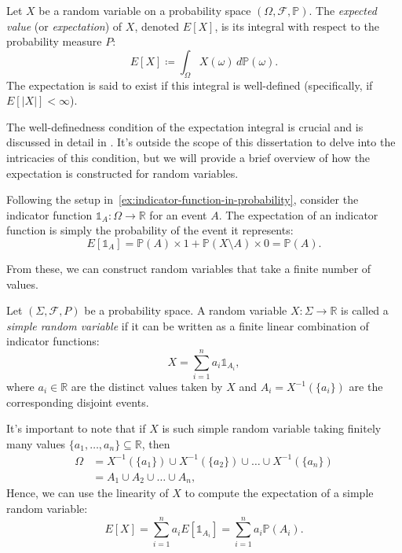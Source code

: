 \begin{definition}
    Let $X$ be a random variable on a probability space $(\Omega, \mathcal{F}, \mathbb{P})$. The \emph{expected value} (or \emph{expectation}) of $X$, denoted $E[X]$, is its integral with respect to the probability measure $P$:
    \[
        E[X] \coloneq \int_{\Omega} X(\omega) \, d\mathbb{P}(\omega).
    \]
    The expectation is said to exist if this integral is well-defined (specifically, if $E[|X|] < \infty$).
\end{definition}

The well-definedness condition of the expectation integral is crucial and is discussed in detail in \cite[Chap 8]{MeasureTheoryLeGall}. It's outside the scope of this dissertation to delve into the intricacies of this condition, but we will provide a brief overview of how the expectation is constructed for random variables.

\begin{example}
    Following the setup in~\ref{ex:indicator-function-in-probability}, consider the indicator function $\mathds{1}_A: \Omega \to \mathbb{R}$ for an event $A$. The expectation of an indicator function is simply the probability of the event it represents:
    \[
        E[\mathds{1}_A] = \mathbb{P}(A) \times 1 + \mathbb{P}(X \setminus A) \times 0 = \mathbb{P}(A).
    \]
\end{example}

From these, we can construct random variables that take a finite number of values.

\begin{definition}
    Let $(\Sigma, \mathcal{F}, P)$ be a probability space. A random variable $X: \Sigma \to \mathbb{R}$ is called a \emph{simple random variable} if it can be written as a finite linear combination of indicator functions:
    \[
        X = \sum_{i=1}^n a_i \mathds{1}_{A_i},
    \]
    where $a_i \in \mathbb{R}$ are the distinct values taken by $X$ and $A_i = X^{-1}(\{a_i\})$ are the corresponding disjoint events.
\end{definition}

It's important to note that if $X$ is such simple random variable taking finitely many values $\{a_1, \dots, a_n\} \subseteq \mathbb{R}$, then
\[
    \begin{aligned}
        \Omega &= X^{-1}(\{a_1\}) \cup X^{-1}(\{a_2\}) \cup \dots \cup X^{-1}(\{a_n\}) \\
        &= A_1 \cup A_2 \cup \dots \cup A_n,
    \end{aligned}
\]
Hence, we can use the linearity of $X$ to compute the expectation of a simple random variable:
\[
    E[X] = \sum_{i=1}^n a_i E[\mathds{1}_{A_i}] = \sum_{i=1}^n a_i \mathbb{P}(A_i).
\]

